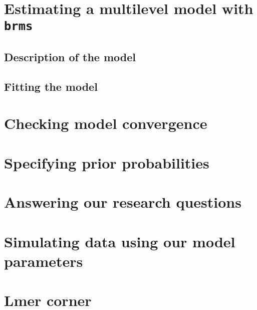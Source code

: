 \documentclass[
]{book}
\begin{document}
\hypertarget{estimating-a-multilevel-model-with-brms}{%
\section{\texorpdfstring{Estimating a multilevel model with \texttt{brms}}{Estimating a multilevel model with brms}}\label{estimating-a-multilevel-model-with-brms}}

\hypertarget{description-of-the-model-1}{%
\subsection{Description of the model}\label{description-of-the-model-1}}

\hypertarget{fitting-the-model}{%
\subsection{Fitting the model}\label{fitting-the-model}}

\hypertarget{checking-model-convergence}{%
\section{Checking model convergence}\label{checking-model-convergence}}

\hypertarget{specifying-prior-probabilities}{%
\section{Specifying prior probabilities}\label{specifying-prior-probabilities}}

\hypertarget{answering-our-research-questions}{%
\section{Answering our research questions}\label{answering-our-research-questions}}

\hypertarget{simulating-data-using-our-model-parameters}{%
\section{Simulating data using our model parameters}\label{simulating-data-using-our-model-parameters}}

\hypertarget{lmer-corner}{%
\section{Lmer corner}\label{lmer-corner}}
\end{document}
